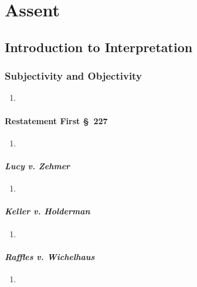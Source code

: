 \section{Assent}

\subsection{Introduction to Interpretation}

\subsubsection{Subjectivity and Objectivity}

\begin{enumerate}
    \item %
\end{enumerate}

\paragraph{Restatement First \S\ 227}

\begin{enumerate}
    \item %
\end{enumerate}

\paragraph{\emph{Lucy v. Zehmer}}

\begin{enumerate}
    \item %
\end{enumerate}

\paragraph{\emph{Keller v. Holderman}}

\begin{enumerate}
    \item %
\end{enumerate}

\paragraph{\emph{Raffles v. Wichelhaus}}

\begin{enumerate}
    \item %
\end{enumerate}

